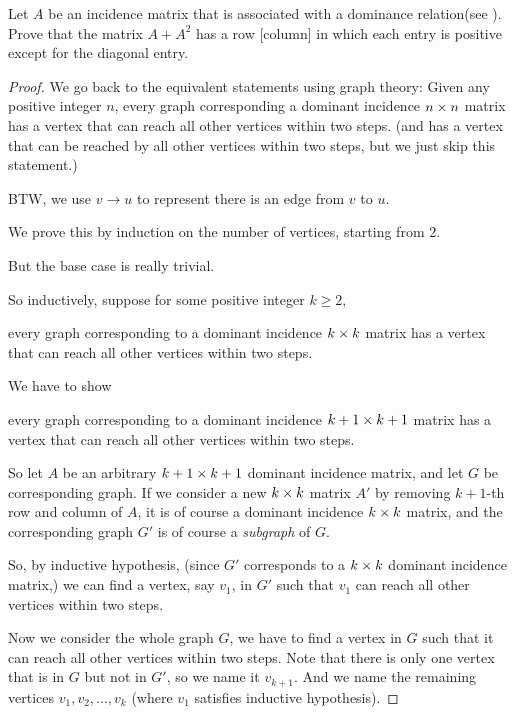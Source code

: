 \begin{exercise} \label{exercise 2.3.22}
Let \(A\) be an incidence matrix that is associated with a dominance relation(see ).
Prove that the matrix \(A + A^2\) has a row [column] in which each entry is positive except for the diagonal entry.
\end{exercise}

\begin{proof}
We go back to the equivalent statements using graph theory: Given any positive integer \(n\), every graph corresponding a dominant incidence \(n \times n\) matrix has a vertex that can reach all other vertices within two steps.
(and has a vertex that can be reached by all other vertices within two steps, but we just skip this statement.)

BTW, we use \(v \to u\) to represent there is an edge from \(v\) to \(u\).

We prove this by induction on the number of vertices, starting from \(2\).

But the base case is really trivial.

So inductively, suppose for some positive integer \(k \ge 2\), \begin{center}
    every graph corresponding to a dominant incidence \(k \times k\) matrix has a vertex that can reach all other vertices within two steps.
\end{center}
We have to show
\begin{center}
    every graph corresponding to a dominant incidence \(k + 1 \times k + 1\) matrix has a vertex that can reach all other vertices within two steps.
\end{center}

So let \(A\) be an arbitrary \(k + 1 \times k + 1\) dominant incidence matrix, and let \(G\) be corresponding graph.
If we consider a new \(k \times k \) matrix \(A'\) by removing \(k+1\)-th row and column of \(A\), it is of course a dominant incidence \(k \times k\) matrix, and the corresponding graph \(G'\) is of course a \emph{subgraph} of \(G\).

So, by inductive hypothesis, (since \(G'\) corresponds to a \(k \times k\) dominant incidence matrix,) we can find a vertex, say \(v_1\), in \(G'\) such that \(v_1\) can reach all other vertices within two steps.

Now we consider the whole graph \(G\), we have to find a vertex in \(G\) such that it can reach all other vertices within two steps.
Note that there is only one vertex that is in \(G\) but not in \(G'\), so we name it \(v_{k + 1}\).
And we name the remaining vertices \(v_1, v_2, ..., v_k\) (where \(v_1\) satisfies inductive hypothesis).


\end{proof}
